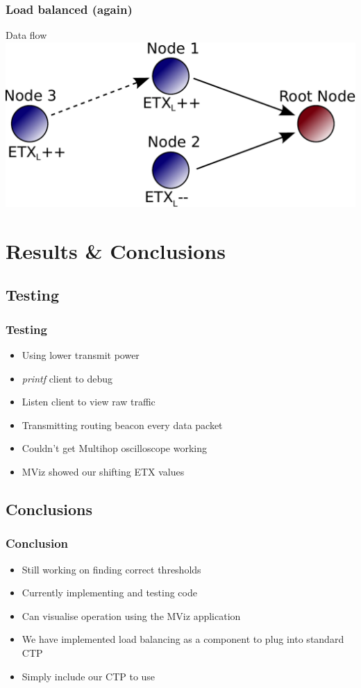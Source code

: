 \documentclass{beamer}
\begin{document}
\begin{frame}[fragile]
  \frametitle{Load balanced (again)}
  \footnotesize{
    \begin{block}{Data flow}
        \includegraphics[width=\textwidth]{Images/Demo_s3}
    \end{block}
  }
\end{frame}

\section{Results \& Conclusions}
\subsection{Testing}

\begin{frame}
  \frametitle{Testing}
  \begin{itemize}
    \item Using lower transmit power
    \item \emph{printf} client to debug
    \item Listen client to view raw traffic
    \item Transmitting routing beacon every data packet
    \item Couldn't get Multihop oscilloscope working
    \item MViz showed our shifting ETX values
  \end{itemize}
\end{frame}  

\subsection{Conclusions}

\begin{frame}
  \frametitle{Conclusion}
  \begin{itemize}
    \item Still working on finding correct thresholds
    \item Currently implementing and testing code
    \item Can visualise operation using the MViz application
    \item We have implemented load balancing as a component to plug into
    standard CTP
    \item Simply include our CTP to use
  \end{itemize}
\end{frame}  
\end{document}
